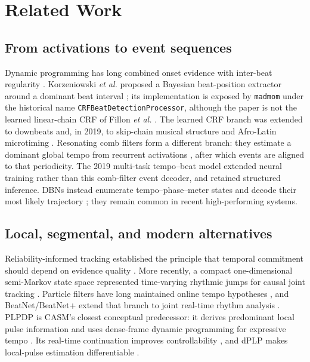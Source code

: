 \documentclass{article}
\begin{document}
\section{Related Work}
\label{sec:related}

\subsection{From activations to event sequences}

Dynamic programming has long combined onset evidence with inter-beat regularity \cite{ellis2007beattracking}. Korzeniowski \emph{et al.} proposed a Bayesian beat-position extractor around a dominant beat interval \cite{korzeniowski2014crf}; its implementation is exposed by \texttt{madmom} under the historical name \texttt{CRFBeatDetectionProcessor}, although the paper is not the learned linear-chain CRF of Fillon \emph{et al.} \cite{fillon2015crf}. The learned CRF branch was extended to downbeats \cite{durand2016crfdownbeat} and, in 2019, to skip-chain musical structure and Afro-Latin microtiming \cite{fuentes2019skipchain,fuentes2019microtiming}. Resonating comb filters form a different branch: they estimate a dominant global tempo from recurrent activations \cite{bock2015combfilter}, after which events are aligned to that periodicity. The 2019 multi-task tempo--beat model \cite{bock2019multitask} extended neural training rather than this comb-filter event decoder, and retained structured inference. DBNs instead enumerate tempo--phase--meter states and decode their most likely trajectory \cite{krebs2015dbn,bock2016joint}; they remain common in recent high-performing systems.

\subsection{Local, segmental, and modern alternatives}

Reliability-informed tracking established the principle that temporal commitment should depend on evidence quality \cite{degara2012reliability}. More recently, a compact one-dimensional semi-Markov state space represented time-varying rhythmic jumps for causal joint tracking \cite{heydari2022semimarkov}. Particle filters have long maintained online tempo hypotheses \cite{hainsworth2004particle}, and BeatNet/BeatNet+ extend that branch to joint real-time rhythm analysis \cite{heydari2021beatnet,heydari2024beatnetplus}. PLPDP is CASM's closest conceptual predecessor: it derives predominant local pulse information and uses dense-frame dynamic programming for expressive tempo \cite{chiu2023localperiodicity}. Its real-time continuation improves controllability \cite{meier2024realtime}, and dPLP makes local-pulse estimation differentiable \cite{chiu2025dplp}.
\end{document}
